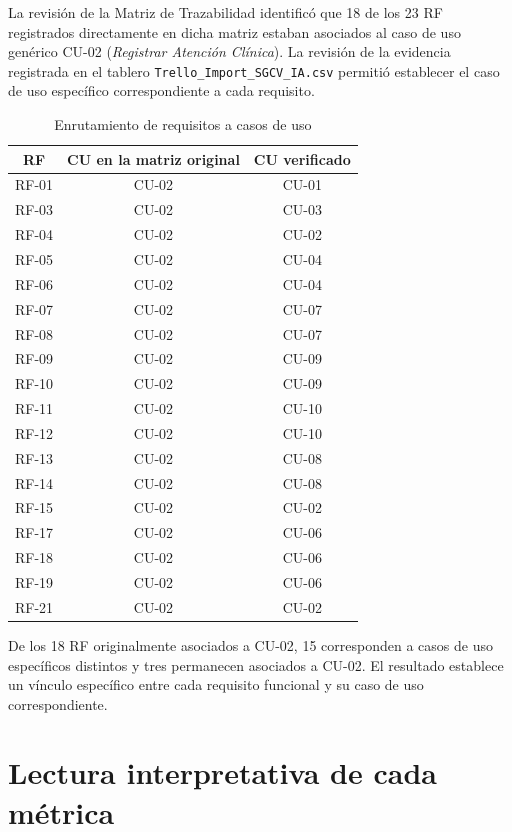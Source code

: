 La revisión de la Matriz de Trazabilidad identificó que 18 de los 23 RF
registrados directamente en dicha matriz estaban asociados al caso de uso
genérico CU-02 (\emph{Registrar Atención Clínica}). La revisión de la evidencia
registrada en el tablero \texttt{Trello\_Import\_SGCV\_IA.csv} permitió
establecer el caso de uso específico correspondiente a cada requisito.

\begin{table}[h]
\centering
\footnotesize
\caption{Enrutamiento de requisitos a casos de uso}
\label{tab:correccion-cu}
\begin{tabular}{|c|c|c|}
\hline
\textbf{RF} & \textbf{CU en la matriz original} & \textbf{CU verificado} \\ \hline
RF-01 & CU-02 & CU-01 \\ \hline
RF-03 & CU-02 & CU-03 \\ \hline
RF-04 & CU-02 & CU-02 \\ \hline
RF-05 & CU-02 & CU-04 \\ \hline
RF-06 & CU-02 & CU-04 \\ \hline
RF-07 & CU-02 & CU-07 \\ \hline
RF-08 & CU-02 & CU-07 \\ \hline
RF-09 & CU-02 & CU-09 \\ \hline
RF-10 & CU-02 & CU-09 \\ \hline
RF-11 & CU-02 & CU-10 \\ \hline
RF-12 & CU-02 & CU-10 \\ \hline
RF-13 & CU-02 & CU-08 \\ \hline
RF-14 & CU-02 & CU-08 \\ \hline
RF-15 & CU-02 & CU-02 \\ \hline
RF-17 & CU-02 & CU-06 \\ \hline
RF-18 & CU-02 & CU-06 \\ \hline
RF-19 & CU-02 & CU-06 \\ \hline
RF-21 & CU-02 & CU-02 \\ \hline
\end{tabular}
\end{table}

De los 18 RF originalmente asociados a CU-02, 15 corresponden a casos de uso
específicos distintos y tres permanecen asociados a CU-02. El resultado
establece un vínculo específico entre cada requisito funcional y su caso de
uso correspondiente.

\section{Lectura interpretativa de cada métrica}

